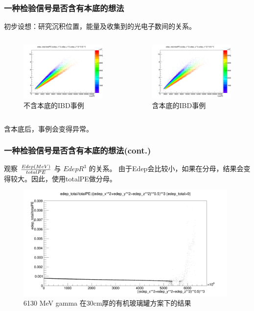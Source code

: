 \begin{frame}
    \frametitle{一种检验信号是否含有本底的想法}
    初步设想：研究沉积位置，能量及收集到的光电子数间的关系。
    \begin{columns}
        \column{6.5cm}
        \begin{figure}
            \includegraphics[width=6.5cm,keepaspectratio]{data/edep_total_vs_pe_vs_edepr3_small.png}
            \caption{不含本底的IBD事例}
        \end{figure}
        \column{6.5cm}
        \begin{figure}
            \includegraphics[width=6.5cm,keepaspectratio]{data/edep_total_vs_pe_vs_edepr3_mixed_small.png}
            \caption{含本底的IBD事例}
        \end{figure}
    \end{columns}
    含本底后，事例会变得异常。
\end{frame}

\begin{frame}
    \frametitle{一种检验信号是否含有本底的想法(cont.)}
    观察 $Edep(MeV) \over totalPE$ 与 $EdepR^{3}$ 的关系。
    由于Edep会比较小，如果在分母，结果会变得较大。因此，使用totalPE做分母。
    \begin{figure}
        \includegraphics[width=11cm,keepaspectratio]{data/edep_total_div_totalPE_vs_edepr3.png}
        \caption{6130 MeV gamma 在30cm厚的有机玻璃罐方案下的结果}
    \end{figure}
\end{frame}

